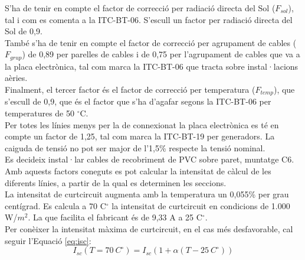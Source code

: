 \newline S'ha de tenir en compte el factor de correcció per radiació directa del Sol ($F_{sol}$), tal i com es comenta a la ITC-BT-06. S'escull un factor per radiació directa del Sol de 0,9.\\
\newline També s'ha de tenir en compte el factor de correcció per agrupament de cables ($F_{grup}$) de 0,89 per parelles de cables i de 0,75 per l'agrupament de cables que va a la placa electrònica, tal com marca la ITC-BT-06 que tracta sobre instal·lacions aèries.\\
\newline Finalment, el tercer factor és el factor de correcció per temperatura ($F_{temp}$), que s'escull de 0,9, que és el factor que s'ha d'agafar segons la ITC-BT-06 per temperatures de 50 $^\circ$C.\\
%
%
%
%
\newline Per totes les línies menys per la de connexionat la placa electrònica es té en compte un factor de 1,25, tal com marca la ITC-BT-19 per generadors. La caiguda de tensió no pot ser major de l'1,5\% respecte la tensió nominal.\\
\newline Es decideix instal·lar cables de recobriment de PVC sobre paret, muntatge C6.\\
%
\newline Amb aquests factors coneguts es pot calcular la intensitat de càlcul de les diferents línies, a partir de la qual es determinen les seccions.\\
\newline La intensitat de curtcircuit augmenta amb la temperatura un 0,055\% per grau centígrad. Es calcula a 70 C$^{\circ}$ la intensitat de curtcircuit en condicions de 1.000 W/$m^2$. La que facilita el fabricant és de 9,33 A a 25 C$^{\circ}$.\\
\newline Per conèixer la intensitat màxima de curtcircuit, en el cas més desfavorable, cal seguir l'Equació \ref{eq:isc}:
\begin{equation} \label{eq:isc}
I_{sc}(T=70\  C ^{\circ})= I_{sc} (1 + \alpha (T-25 \ C^{\circ}))
\end{equation}

